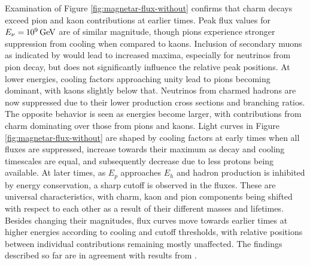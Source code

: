 Examination of Figure \ref{fig:magnetar-flux-without} confirms that charm decays exceed pion and kaon contributions at earlier times.
Peak flux values for $E_\nu = \kern-0.5pt \qty{e9}{\giga\electronvolt}$ are of similar magnitude, though pions experience stronger
suppression from cooling when compared to kaons. Inclusion of secondary muons as indicated by \cite{Carpio_2020} would
lead to increased maxima, especially for neutrinos from pion decay, but does not significantly influence the relative peak positions.
At lower energies, cooling factors approaching unity lead to pions becoming dominant, with kaons slightly below that. Neutrinos
from charmed hadrons are now suppressed due to their lower production cross sections and branching ratios. The opposite behavior
is seen as energies become larger, with contributions from charm dominating over those from pions and kaons. Light curves in Figure
\ref{fig:magnetar-flux-without} are shaped by cooling factors at early times when all fluxes are suppressed, increase towards their
maximum as decay and cooling timescales are equal, and subsequently decrease due to less protons being available. At later times,
as $E_p$ approaches $E_h$ and hadron production is inhibited by energy conservation, a sharp cutoff is observed in the fluxes. These
are universal characteristics, with charm, kaon and pion components being shifted with respect to each other as a result of their
different masses and lifetimes. Besides changing their magnitudes, flux curves move towards earlier times at higher energies
according to cooling and cutoff thresholds, with relative positions between individual contributions remaining mostly unaffected. 
The findings described so far are in agreement with results from \cite{Carpio_2020}.

\newpage

